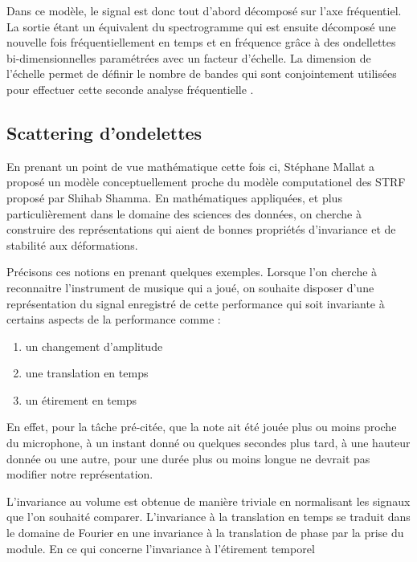 Dans ce modèle, le signal est donc tout d'abord décomposé sur l'axe fréquentiel. La sortie étant un équivalent du spectrogramme qui est ensuite décomposé une nouvelle fois fréquentiellement en temps et en fréquence grâce à des ondellettes bi-dimensionnelles paramétrées avec un facteur d'échelle. La dimension de l'échelle permet de définir le nombre de bandes qui sont conjointement utilisées pour effectuer cette seconde analyse fréquentielle .

\subsection{Scattering d'ondelettes}

En prenant un point de vue mathématique cette fois ci, Stéphane Mallat a proposé un modèle conceptuellement proche du modèle computationel des STRF proposé par Shihab Shamma. En mathématiques appliquées, et plus particulièrement dans le domaine des sciences des données, on cherche à construire des représentations qui aient de bonnes propriétés d'invariance et de stabilité aux déformations.

Précisons ces notions en prenant quelques exemples. Lorsque l'on cherche à reconnaitre l'instrument de musique qui a joué, on souhaite disposer d'une représentation du signal enregistré de cette performance qui soit invariante à certains aspects de la performance comme :
\begin{enumerate}
  \item un changement d'amplitude
  \item une translation en temps
  \item un étirement en temps
\end{enumerate}
En effet, pour la tâche pré-citée, que la note ait été jouée plus ou moins proche du microphone, à un instant donné ou quelques secondes plus tard, à une hauteur donnée ou une autre, pour une durée plus ou moins longue ne devrait pas modifier notre représentation.

L'invariance au volume est obtenue de manière triviale en normalisant les signaux que l'on souhaité comparer. L'invariance à la translation en temps se traduit dans le domaine de Fourier en une invariance à la translation de phase par la prise du module. En ce qui concerne l'invariance à l'étirement temporel

